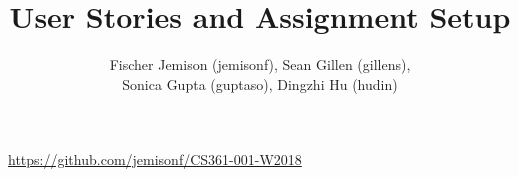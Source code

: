 \documentclass[12pt]{article}
\title{User Stories and Assignment Setup}
\author{Fischer Jemison (jemisonf), Sean Gillen (gillens), \\
Sonica Gupta (guptaso), Dingzhi Hu (hudin) }
\begin{document}
\maketitle
\centerline{\url{https://github.com/jemisonf/CS361-001-W2018}}
\tableofcontents




\end{document}
